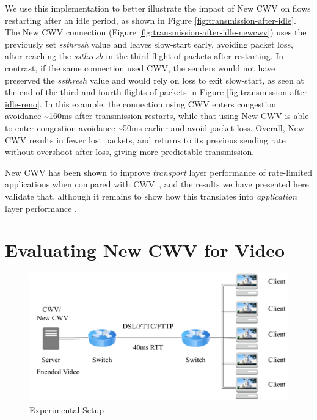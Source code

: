 \documentclass[10pt,sigconf]{acmart}
\begin{document}
We use this implementation to better illustrate the impact of New CWV on flows restarting after an idle period, as shown in Figure \ref{fig:transmission-after-idle}.
The New CWV connection (Figure \ref{fig:transmission-after-idle-newcwv}) uses the previously set \emph{ssthresh} value and leaves slow-start early, avoiding packet loss, after reaching the \emph{ssthresh} in the third flight of packets after restarting. 
In contrast, if the same connection used CWV, the senders would not have preserved the \emph{ssthresh} value and would rely on loss to exit slow-start, as seen at the end of the third and fourth flights of packets in Figure \ref{fig:transmission-after-idle-reno}. In this example, the connection using CWV enters congestion avoidance \textasciitilde160ms after transmission restarts, while that using New CWV is able to enter congestion avoidance \textasciitilde50ms earlier and avoid packet loss.
Overall, New CWV results in fewer lost packets, and returns to its previous sending rate without overshoot after loss, giving more predictable transmission.

New CWV has been shown to improve \emph{transport} layer performance of rate-limited applications when compared with CWV~\cite{Nazir-2014-performance-evaluation-congestion-window-validation-dash-newcwv}, and the results we have presented here validate that, although it remains to show how this translates into \emph{application} layer performance \cite{Spiteri-2016-BOLA}. 

\section{Evaluating New CWV for Video}
\label{sec:evaluation}

\begin{figure}
  \centering
  \includegraphics[width=.45\textwidth]{figures/setup.pdf}
  \caption{Experimental Setup}
  \label{fig:experimental-setup}
\end{figure}
\end{document}
